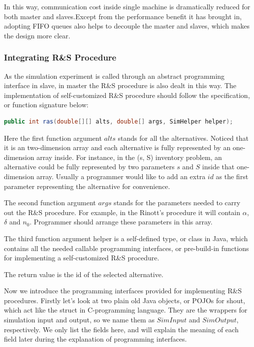 In this way, communication cost inside single machine is dramatically reduced for both master and slaves.Except from the performance benefit it has brought in, adopting FIFO queues also helps to decouple the master and slaves, which makes the design more clear.

\subsubsection{Integrating R\&S Procedure}

As the simulation experiment is called through an abstract programming interface in slave, in master the R\&S procedure is also dealt in this way. The implementation of self-customized R\&S procedure should follow the specification, or function signature below:

\begin{lstlisting}[language=Java]
public int ras(double[][] alts, double[] args, SimHelper helper);
\end{lstlisting}

Here the first function argument $alts$ stands for all the alternatives. Noticed that it is an two-dimension array and each alternative is fully represented by an one-dimension array inside. For instance, in the (s, S) inventory problem, an alternative could be fully represented by two parameters $s$ and $S$ inside that one-dimension array. Usually a programmer would like to add an extra $id$ as the first parameter representing the alternative for convenience.

The second function argument $args$ stands for the parameters needed to carry out the R\&S procedure. For example, in the Rinott's procedure it will contain $\alpha$, $\delta$ and $n_0$. Programmer should arrange these parameters in this array.

The third function argument helper is a self-defined type, or class in Java, which contains all the needed callable programming interfaces, or pre-build-in functions for implementing a self-customized R\&S procedure.

The return value is the id of the selected alternative.

Now we introduce the programming interfaces provided for implementing R\&S procedures. Firstly let's look at two plain old Java objects, or POJOs for shout, which act like the struct in C-programming language. They are the wrappers for simulation input and output, so we name them as $SimInput$ and $SimOutput$, respectively. We only list the fields here, and will explain the meaning of each field later during the explanation of programming interfaces.

